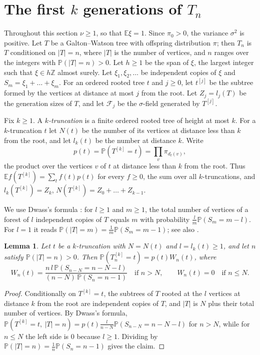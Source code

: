 \documentclass[11pt]{amsart}
\newtheorem{lemma}[theorem]{Lemma}
\theoremstyle{remark}
\numberwithin{equation}{section}
\newcommand{\Pp}{\mathbb P}
\newcommand{\E}{\mathbb E}
\newcommand{\Z}{\mathbb Z}
\newcommand{\cF}{\mathcal F}
\begin{document}
\section{The first \texorpdfstring{$k$}{k} generations of \texorpdfstring{$T_n$}{Tn}}\label{sec:prelim}

Throughout this section $\nu\ge1$, so that $\E\xi=1$. Since $\pi_0>0$, the variance $\sigma^2$ is positive. Let $T$ be a Galton--Watson tree with offspring distribution $\pi$; then $T_n$ is $T$ conditioned on $|T|=n$, where $|T|$ is the number of vertices, and $n$ ranges over the integers with $\Pp(|T|=n)>0$. Let $h\ge1$ be the span of $\xi$, the largest integer such that $\xi\in h\Z$ almost surely. Let $\xi_1,\xi_2,\dots$ be independent copies of $\xi$ and $S_m=\xi_1+\dots+\xi_m$. For an ordered rooted tree $t$ and $j\ge0$, let $t^{[j]}$ be the subtree formed by the vertices at distance at most $j$ from the root. Let $Z_j=l_j(T)$ be the generation sizes of $T$, and let $\cF_j$ be the $\sigma$-field generated by $T^{[j]}$.

Fix $k\ge1$. A \emph{$k$-truncation} is a finite ordered rooted tree of height at most $k$. For a $k$-truncation $t$ let $N(t)$ be the number of its vertices at distance less than $k$ from the root, and let $l_k(t)$ be the number at distance $k$. Write
\[
p(t)=\Pp(T^{[k]}=t)=\prod_{v}\pi_{d_t(v)},
\]
the product over the vertices $v$ of $t$ at distance less than $k$ from the root. Thus $\E f(T^{[k]})=\sum_t f(t)p(t)$ for every $f\ge0$, the sum over all $k$-truncations, and $l_k(T^{[k]})=Z_k$, $N(T^{[k]})=Z_0+\dots+Z_{k-1}$.

We use Dwass's formula \cite{Dwa69}: for $l\ge1$ and $m\ge1$, the total number of vertices of a forest of $l$ independent copies of $T$ equals $m$ with probability $\frac lm\Pp(S_m=m-l)$. For $l=1$ it reads $\Pp(|T|=m)=\frac1m\Pp(S_m=m-1)$; see also \cite[Theorem~15.5]{J12}.

\begin{lemma}\label{lem:density}
Let $t$ be a $k$-truncation with $N=N(t)$ and $l=l_k(t)\ge1$, and let $n$ satisfy $\Pp(|T|=n)>0$. Then $\Pp(T_n^{[k]}=t)=p(t)W_n(t)$, where
\begin{equation}\label{eq:W}
W_n(t)=\frac{n\,l\,\Pp(S_{n-N}=n-N-l)}{(n-N)\,\Pp(S_n=n-1)}\quad\text{if } n>N,\qquad W_n(t)=0\quad\text{if } n\le N.
\end{equation}
\end{lemma}

\begin{proof}
Conditionally on $T^{[k]}=t$, the subtrees of $T$ rooted at the $l$ vertices at distance $k$ from the root are independent copies of $T$, and $|T|$ is $N$ plus their total number of vertices. By Dwass's formula, $\Pp(T^{[k]}=t,\ |T|=n)=p(t)\frac{l}{n-N}\Pp(S_{n-N}=n-N-l)$ for $n>N$, while for $n\le N$ the left side is $0$ because $l\ge1$. Dividing by $\Pp(|T|=n)=\frac1n\Pp(S_n=n-1)$ gives the claim.
\end{proof}
\end{document}
